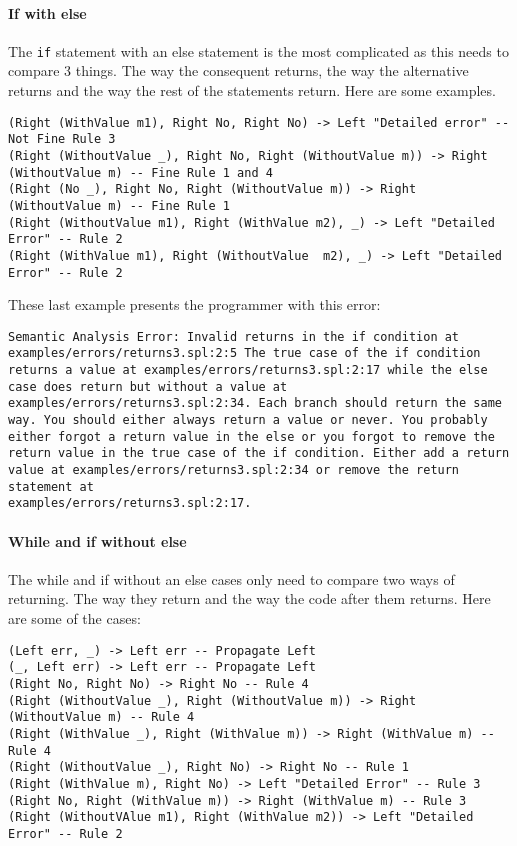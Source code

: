 \documentclass{report}
\begin{document}
\paragraph{If with else} The \texttt{if} statement with an else statement is the most complicated as this needs to compare 3 things. The way the consequent returns, the way the alternative returns and the way the rest of the statements return. Here are some examples. 
\begin{verbatim}
(Right (WithValue m1), Right No, Right No) -> Left "Detailed error" -- Not Fine Rule 3
(Right (WithoutValue _), Right No, Right (WithoutValue m)) -> Right (WithoutValue m) -- Fine Rule 1 and 4
(Right (No _), Right No, Right (WithoutValue m)) -> Right (WithoutValue m) -- Fine Rule 1
(Right (WithoutValue m1), Right (WithValue m2), _) -> Left "Detailed Error" -- Rule 2
(Right (WithValue m1), Right (WithoutValue  m2), _) -> Left "Detailed Error" -- Rule 2
\end{verbatim}

These last example presents the programmer with this error:

\noindent \texttt{\textcolor{error}{Semantic Analysis Error: Invalid returns} in the if condition at \textcolor{filename}{examples/errors/returns3.spl:2:5}
The true case of the if condition returns a value at \textcolor{filename}{examples/errors/returns3.spl:2:17} while the else case does return but without a value at \textcolor{filename}{examples/errors/returns3.spl:2:34}. 
Each branch should return the same way. You should either always return a value or never. You probably either forgot a return value in the else or you forgot to remove the return value in the true case of the if condition.  Either add a return value at \textcolor{filename}{examples/errors/returns3.spl:2:34} or remove the return statement at\\ \textcolor{filename}{examples/errors/returns3.spl:2:17}.}

\paragraph{While and if without else} The while and if without an else cases only need to compare two ways of returning. The way they return and the way the code after them returns. Here are some of the cases:
\begin{verbatim}
(Left err, _) -> Left err -- Propagate Left
(_, Left err) -> Left err -- Propagate Left
(Right No, Right No) -> Right No -- Rule 4
(Right (WithoutValue _), Right (WithoutValue m)) -> Right (WithoutValue m) -- Rule 4
(Right (WithValue _), Right (WithValue m)) -> Right (WithValue m) -- Rule 4
(Right (WithoutValue _), Right No) -> Right No -- Rule 1
(Right (WithValue m), Right No) -> Left "Detailed Error" -- Rule 3
(Right No, Right (WithValue m)) -> Right (WithValue m) -- Rule 3
(Right (WithoutVAlue m1), Right (WithValue m2)) -> Left "Detailed Error" -- Rule 2
\end{verbatim}
\end{document}
